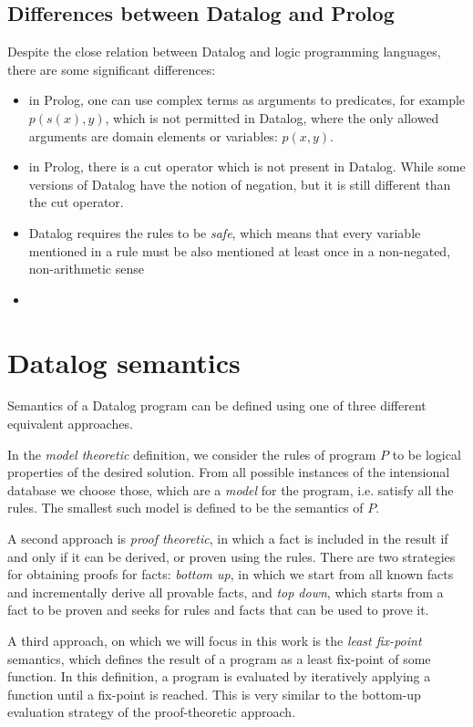 \documentclass{pracamgr}
\theoremstyle{plain}
\theoremstyle{definition}
\theoremstyle{remark}
\begin{document}
\subsection{Differences between Datalog and Prolog}
Despite the close relation between Datalog and logic programming languages, there are some significant differences:
\begin{itemize}
\item in Prolog, one can use complex terms as arguments to predicates, for example $p(s(x), y)$, which is not permitted in Datalog, where the only allowed arguments are domain elements or variables: $p(x, y)$.
\item in Prolog, there is a cut operator which is not present in Datalog. While some versions of Datalog have the notion of negation, but it is still different than the cut operator.
\item Datalog requires the rules to be \emph{safe}, which means that every variable mentioned in a rule must be also mentioned at least once in a non-negated, non-arithmetic sense
\item 
\end{itemize}


\section{Datalog semantics}
Semantics of a Datalog program can be defined using one of three different equivalent approaches.

In the \emph{model theoretic} definition, we consider the rules of program $P$ to be logical properties of the desired solution. From all possible instances of the intensional database we choose those, which are a \emph{model} for the program, i.e. satisfy all the rules. The smallest such model is defined to be the semantics of $P$.

A second approach is \emph{proof theoretic}, in which a fact is included in the result if and only if it can be derived, or proven using the rules. There are two strategies for obtaining proofs for facts: \emph{bottom up}, in which we start from all known facts and incrementally derive all provable facts, and \emph{top down}, which starts from a fact to be proven and seeks for rules and facts that can be used to prove it.

A third approach, on which we will focus in this work is the \emph{least fix-point} semantics, which defines the result of a program as a least fix-point of some function. In this definition, a program is evaluated by iteratively applying a function until a fix-point is reached. This is very similar to the bottom-up evaluation strategy of the proof-theoretic approach.
\end{document}
